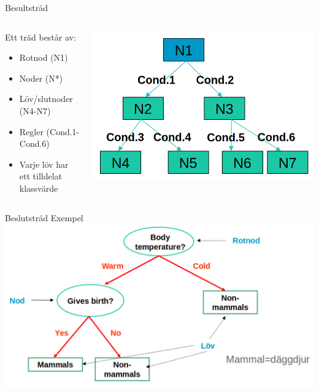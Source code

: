 \documentclass[10pt,english]{beamer}
\begin{document}
\begin{frame}{Besultsträd}
    \begin{columns}
        \begin{column}{0.5\textwidth}
           Ett träd består av:
           \begin{itemize}
            \item Rotnod (N1)
            \item Noder (N*)
            \item Löv/slutnoder (N4-N7)
            \item Regler (Cond.1-Cond.6)
            \item Varje löv har ett tilldelat klassvärde
           \end{itemize}
        \end{column}
        \begin{column}{0.5\textwidth}  %
            \begin{center}
             \includegraphics[width=\textwidth]{figs/tree1.png}
             \end{center}
        \end{column}
        \end{columns}
\end{frame}

\begin{frame}{Beslutsträd Exempel}
    \includegraphics[width=\textwidth]{figs/tree2.png}
\end{frame}
\end{document}
